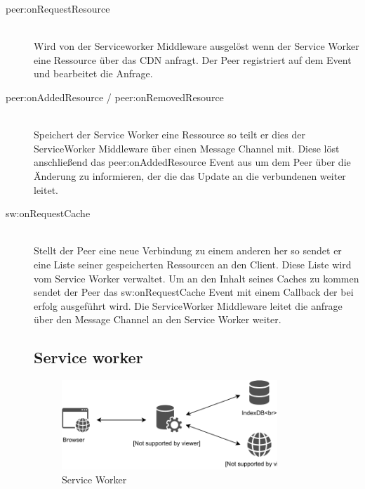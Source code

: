 \begin{description}
	\item[peer:onRequestResource]\hfill \\
	Wird von der Serviceworker Middleware ausgelöst wenn der Service Worker eine Ressource über das \pTp CDN anfragt. Der Peer registriert auf dem Event und bearbeitet die Anfrage.
	\item[peer:onAddedResource / peer:onRemovedResource]\hfill \\
	Speichert der Service Worker eine Ressource so teilt er dies der ServiceWorker Middleware über einen Message Channel mit. Diese löst anschließend das peer:onAddedResource Event aus um dem Peer über die Änderung zu informieren, der die das Update an die verbundenen \clients weiter leitet.
	\item[sw:onRequestCache]\hfill \\
	Stellt der Peer eine neue Verbindung zu einem anderen \client her so sendet er eine Liste seiner gespeicherten Ressourcen an den Client. Diese Liste wird vom Service Worker verwaltet. Um an den Inhalt seines Caches zu kommen sendet der Peer das sw:onRequestCache Event mit einem Callback der bei erfolg ausgeführt wird. Die ServiceWorker Middleware leitet die anfrage über den Message Channel an den Service Worker weiter.
%	
%

\subsection{Service worker}

\begin{figure}[!h]
	\centering
	\includegraphics[width=0.8\textwidth]{figures/ServiceWorker}
	\caption[A Figure Short-Title]{Service Worker}
	\label{fig:serviceWorker}
\end{figure}


\end{description}
